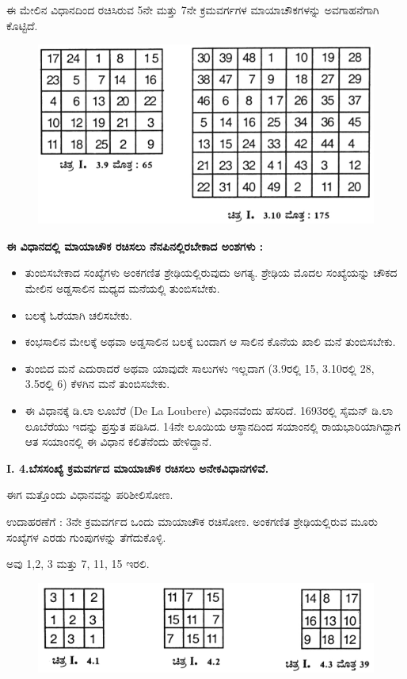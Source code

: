 \begin{itemize}
	ಈ ಮೇಲಿನ ವಿಧಾನದಿಂದ ರಚಿಸಿರುವ 5ನೇ ಮತ್ತು 7ನೇ ಕ್ರಮವರ್ಗಗಳ ಮಾಯಾಚೌಕಗಳನ್ನು ಅವಗಾಹನೆಗಾಗಿ ಕೊಟ್ಟಿದೆ.
	\begin{figure}[H]
	\includegraphics[scale=.9]{src/figures/chap3/fig3-8.jpg}
	\end{figure}
\end{itemize}

\noindent \textbf{ಈ ವಿಧಾನದಲ್ಲಿ ಮಾಯಾಚೌಕ ರಚಿಸಲು ನೆನಪಿನಲ್ಲಿರಬೇಕಾದ ಅಂಶಗಳು :}
\begin{itemize}
	\item ತುಂಬಿಸಬೇಕಾದ ಸಂಖ್ಯೆಗಳು ಅಂಕಗಣಿತ ಶ್ರೇಢಿಯಲ್ಲಿರುವುದು ಅಗತ್ಯ. ಶ್ರೇಢಿಯ ಮೊದಲ ಸಂಖ್ಯೆಯನ್ನು ಚೌಕದ ಮೇಲಿನ ಅಡ್ಡಸಾಲಿನ ಮಧ್ಯದ ಮನೆಯಲ್ಲಿ ತುಂಬಿಸಬೇಕು.
	\item ಬಲಕ್ಕೆ ಓರೆಯಾಗಿ ಚಲಿಸಬೇಕು.
	\item ಕಂಭಸಾಲಿನ ಮೇಲಕ್ಕೆ ಅಥವಾ ಅಡ್ಡಸಾಲಿನ ಬಲಕ್ಕೆ ಬಂದಾಗ ಆ ಸಾಲಿನ ಕೊನೆಯ ಖಾಲಿ ಮನೆ ತುಂಬಿಸಬೇಕು.
	\item ತುಂಬಿದ ಮನೆ ಎದುರಾದರೆ ಅಥವಾ ಯಾವುದೇ ಸಾಲುಗಳು ಇಲ್ಲದಾಗ (3.9ರಲ್ಲಿ 15, 3.10ರಲ್ಲಿ 28, 3.5ರಲ್ಲಿ 6) ಕೆಳಗಿನ ಮನೆ ತುಂಬಿಸಬೇಕು.
	\item ಈ ವಿಧಾನಕ್ಕೆ ಡಿ.ಲಾ ಲೂಬೆರೆ (De La Loubere) ವಿಧಾನವೆಂದು ಹೆಸರಿದೆ. 1693ರಲ್ಲಿ ಸೈಮನ್ ಡಿ.ಲಾ ಲೂಬೆರೆಯು ಇದನ್ನು ಪ್ರಸ್ತುತ ಪಡಿಸಿದ. 14ನೇ \break ಲೂಯಿಯ ಆಸ್ಥಾನದಿಂದ ಸಯಾಂನಲ್ಲಿ ರಾಯಭಾರಿಯಾಗಿದ್ದಾಗ ಆತ ಸಯಾಂನಲ್ಲಿ ಈ ವಿಧಾನ ಕಲಿತೆನೆಂದು ಹೇಳಿದ್ದಾನೆ.
\end{itemize}

\noindent \textbf{I. 4.ಬೆಸಸಂಖ್ಯೆ ಕ್ರಮವರ್ಗದ ಮಾಯಾಚೌಕ ರಚಿಸಲು ಅನೇಕವಿಧಾನಗಳಿವೆ.}

ಈಗ ಮತ್ತೊಂದು ವಿಧಾನವನ್ನು ಪರಿಶೀಲಿಸೋಣ.

ಉದಾಹರಣೆಗೆ : 3ನೇ ಕ್ರಮವರ್ಗದ ಒಂದು ಮಾಯಾಚೌಕ ರಚಿಸೋಣ. ಅಂಕಗಣಿತ ಶ್ರೇಢಿಯಲ್ಲಿರುವ ಮೂರು ಸಂಖ್ಯೆಗಳ ಎರಡು ಗುಂಪುಗಳನ್ನು ತೆಗೆದುಕೊಳ್ಳಿ.

ಅವು 1,2, 3 ಮತ್ತು 7, 11, 15 ಇರಲಿ.
\begin{figure}[H]
\includegraphics{src/figures/chap3/fig3-9.jpg}
\end{figure}

